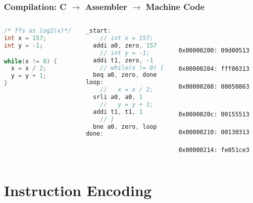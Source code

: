 \documentclass{beamer}
\begin{document}
\begin{frame}[fragile,shrink=10]
\frametitle{Compilation: C $\to$ Assembler $\to$ Machine Code}

\begin{columns}
\begin{column}{0.3\textwidth}
\begin{lstlisting}[language={C},columns=flexible]
/* ffs as log2(x)*/
int x = 157;
int y = -1;

while(x != 0) {
  x = x / 2;
  y = y + 1;
}
\end{lstlisting}
\end{column}

\begin{column}{0.35\textwidth}
\begin{lstlisting}[language={C},columns=flexible]
_start:
    // int x = 157;
  addi a0, zero, 157
    // int y = -1;
  addi t1, zero, -1
    // while(x != 0) {
  beq a0, zero, done
loop:
    //   x = x / 2;
  srli a0, a0, 1
    //   y = y + 1;
  addi t1, t1, 1
    // }
  bne a0, zero, loop
done:
\end{lstlisting}
\end{column}

\begin{column}{0.32\textwidth}
\texttt{\phantom{x} \\
\phantom{x} \\
0x00000200:  09d00513\\
\phantom{x} \\
0x00000204:  fff00313\\
\phantom{x} \\
0x00000208:  00050863\\
\phantom{x} \\
\phantom{x} \\
0x0000020c:  00155513\\
\phantom{x} \\
0x00000210:  00130313\\
\phantom{x} \\
0x00000214:  fe051ce3 \\
\phantom{x} }
\end{column}

\end{columns}

\end{frame}

\section{Instruction Encoding}
\end{document}
